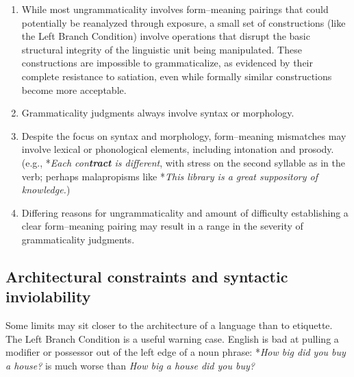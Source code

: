 \begin{enumerate}
\begin{enumerate}
\begin{enumerate}
            \item processing constraints \\(e.g., length, embedding, long dependency distances)
            \item lack of clarity \\(e.g., after loss of inflectional endings, Jespersen's cycle, etc.)
            \item structural analogy \\(e.g., \textsuperscript{?}\textit{I asked about what did she do.})
        \end{enumerate}
        \item Iconic usage in rare instances \\(e.g., trilled /r/)
    \end{enumerate}
    \item While most ungrammaticality involves form--meaning pairings that could potentially be reanalyzed through exposure, a small set of constructions (like the Left Branch Condition) involve operations that disrupt the basic structural integrity of the linguistic unit being manipulated. These constructions are impossible to grammaticalize, as evidenced by their complete resistance to satiation, even while formally similar constructions become more acceptable.
    \item Grammaticality judgments always involve syntax or morphology.
    \item Despite the focus on syntax and morphology, form--meaning mismatches may involve lexical or phonological elements, including intonation and prosody. \\(e.g., *\textit{Each con\textbf{tract} is different}, with stress on the second syllable as in the verb; perhaps malapropisms like *\textit{This library is a great suppository of knowledge.})
    \item Differing reasons for ungrammaticality and amount of difficulty establishing a clear form--meaning pairing may result in a range in the severity of grammaticality judgments.
\end{enumerate}

\subsection{Architectural constraints and syntactic inviolability}
Some limits may sit closer to the architecture of a language than to
etiquette. The Left Branch Condition is a useful warning case. English is
bad at pulling a modifier or possessor out of the left edge of a noun
phrase: *\textit{How big did you buy a house?} is much worse than
\textit{How big a house did you buy?}


